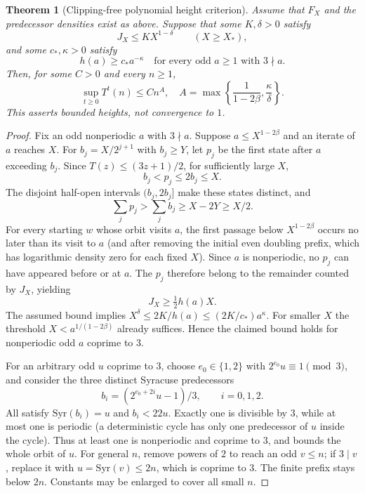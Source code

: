 \documentclass[11pt]{amsart}
\newtheorem{theorem}{Theorem}
\theoremstyle{remark}\newtheorem{remark}{Remark}
\begin{document}
\begin{theorem}[Clipping-free polynomial height criterion]\label{thm:height}
Assume that $F_X$ and the predecessor densities exist as above.  Suppose that some $K,\delta>0$ satisfy
\begin{equation}\label{eq:power}
 J_X\le K X^{1-\delta}\qquad(X\ge X_*),
\end{equation}
and some $c_*,\kappa>0$ satisfy
\begin{equation}\label{eq:pred}
 h(a)\ge c_* a^{-\kappa}\quad\text{for every odd }a\ge1\text{ with }3\nmid a.
\end{equation}
Then, for some $C>0$ and every $n\ge1$,
\[
 \boxed{\sup_{t\ge0}T^t(n)\le Cn^{A},\quad A=\max\left\{\frac1{1-2\beta},\frac{\kappa}{\delta}\right\}.}
\]
This asserts bounded heights, not convergence to $1$.
\end{theorem}
\begin{proof}
Fix an odd nonperiodic $a$ with $3\nmid a$.  Suppose $a\le X^{1-2\beta}$ and an iterate of $a$ reaches $X$.  For $b_j=X/2^{j+1}$ with $b_j\ge Y$, let $p_j$ be the first state after $a$ exceeding $b_j$.  Since $T(z)\le(3z+1)/2$, for sufficiently large $X$,
\[
 b_j<p_j\le 2b_j\le X.
\]
The disjoint half-open intervals $(b_j,2b_j]$ make these states distinct, and
\[
 \sum_jp_j>\sum_jb_j\ge X-2Y\ge X/2.
\]
For every starting $w$ whose orbit visits $a$, the first passage below $X^{1-2\beta}$ occurs no later than its visit to $a$ (and after removing the initial even doubling prefix, which has logarithmic density zero for each fixed $X$).  Since $a$ is nonperiodic, no $p_j$ can have appeared before or at $a$.  The $p_j$ therefore belong to the remainder counted by $J_X$, yielding
\[
 J_X\ge \tfrac12 h(a) X.
\]
The assumed bound implies $X^{\delta}\le 2K/h(a)\le(2K/c_*)a^{\kappa}$.  For smaller $X$ the threshold $X<a^{1/(1-2\beta)}$ already suffices.  Hence the claimed bound holds for nonperiodic odd $a$ coprime to $3$.

For an arbitrary odd $u$ coprime to $3$, choose $e_0\in\{1,2\}$ with $2^{e_0}u\equiv1\pmod3$, and consider the three distinct Syracuse predecessors
\[
 b_i=(2^{e_0+2i}u-1)/3,\qquad i=0,1,2.
\]
All satisfy $\mathrm{Syr}(b_i)=u$ and $b_i<22u$.  Exactly one is divisible by $3$, while at most one is periodic (a deterministic cycle has only one predecessor of $u$ inside the cycle).  Thus at least one is nonperiodic and coprime to $3$, and bounds the whole orbit of $u$.  For general $n$, remove powers of $2$ to reach an odd $v\le n$; if $3\mid v$, replace it with $u=\mathrm{Syr}(v)\le2n$, which is coprime to $3$.  The finite prefix stays below $2n$.  Constants may be enlarged to cover all small $n$.
\end{proof}
\end{document}

